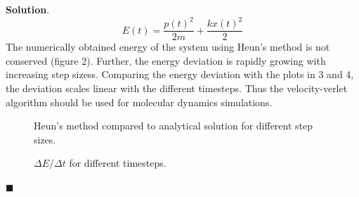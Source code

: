 \documentclass[12pt]{article}
\renewcommand{\=}[1]{\stackrel{#1}{=}} %
\theoremstyle{definition}
\newenvironment{s}{%
        \begin{trivlist} \item \textbf{Solution}. }{%
            \hspace*{\fill} $\blacksquare$\end{trivlist}}%
\begin{document}
\begin{s}
%
\begin{equation}
	E(t) = \frac{p(t)^2} {2m} + \frac{kx(t)^2} {2}
\end{equation}
%
The numerically obtained energy of the system using Heun's method is not conserved (figure 2). Further, the energy deviation is rapidly growing with increasing step sizess. Comparing the energy deviation with the plots in 3 and 4, the deviation scales linear with the different timesteps. Thus the velocity-verlet algorithm should be used for molecular dynamics simulations. 
%
\begin{figure}[!h]
	\caption {Heun's method compared to analytical solution for different step sizes.}
\end{figure}
%
%
\begin{figure}[!h]
	\caption{$\Delta E / \Delta t$ for different timesteps.}
\end{figure}
%


\end{s}
\end{document}
